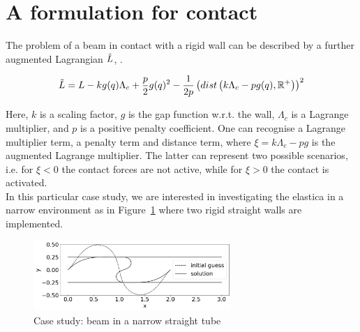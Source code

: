 \section*{A formulation for contact}

The problem of a beam in contact with a rigid wall can be described by a further augmented Lagrangian $\Tilde{L}$, \cite{alart1991}.

\begin{equation}\label{eq:L_constraint}
    \Tilde{L} = L - k g(q) \Lambda_c + \frac{p}{2} g(q)^2 - \frac{1}{2p} \left( dist\left( k \Lambda_c - pg(q), \mathbb{R}^+ \right) \right)^2
\end{equation}

Here, $k$ is a scaling factor, $g$ is the gap function w.r.t. the wall, $\Lambda_c$ is a Lagrange multiplier, and $p$ is a positive penalty coefficient. One can recognise a Lagrange multiplier term, a penalty term and distance term, where $\xi=k \Lambda_c - pg$ is the augmented Lagrange multiplier. The latter can represent two possible scenarios, i.e. for $\xi<0$ the contact forces are not active, while for $\xi>0$ the contact is activated. \\
In this particular case study, we are interested in investigating the elastica in a narrow environment as in Figure~\ref{fig:ESR10_contact} where two rigid straight walls are implemented.

\begin{figure}[!ht]
    \centering
    \includegraphics[width=7.5cm]{docs/figures/contact_bw.png}
    \caption{Case study: beam in a narrow straight tube}
    \label{fig:ESR10_contact}
\end{figure}




